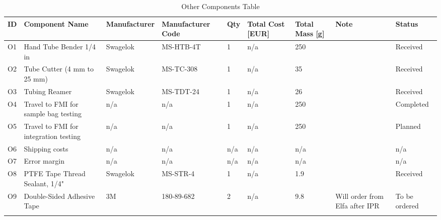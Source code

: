 \begin{longtable} {|m{}|m{}|m{}|m{}|m{}|m{}|m{}|m{}|m{}|} \hline \textbf{ID} & \textbf{Component Name} & \textbf{Manufacturer} & \textbf{Manufacturer Code} & \textbf{Qty} & \textbf{Total Cost [EUR]} & \textbf{Total Mass [g]}  & \textbf{Note}  & \textbf{Status} \\ \hline O1 & Hand Tube Bender 1/4 in & Swagelok & MS-HTB-4T & 1 & n/a & 250 &  & Received \\ \hline O2 & Tube Cutter (4 mm to 25 mm) & Swagelok & MS-TC-308 & 1 & n/a & 35 &  & Received \\ \hline O3 & Tubing Reamer & Swagelok & MS-TDT-24 & 1 & n/a & 26 &  & Received \\ \hline O4 & Travel to FMI for sample bag testing & n/a & n/a & 1 & n/a & 250 &  & Completed \\ \hline O5 & Travel to FMI for integration testing & n/a & n/a & 1 & n/a & 250 &  & Planned \\ \hline O6 & Shipping costs & n/a & n/a & n/a & n/a & n/a &  & n/a \\ \hline O7 & Error margin & n/a & n/a & n/a & n/a & n/a &  & n/a \\ \hline O8 & PTFE Tape Thread Sealant, 1/4" & Swagelok & MS-STR-4 & 1 & n/a & 1.9 &  & Received \\ \hline O9 & Double-Sided Adhesive Tape & 3M & 180-89-682 & 2 & n/a & 9.8 & Will order from Elfa after IPR & To be ordered \\ \hline \caption{Other Components Table} \label{tab:component-table-other} \end{longtable} \raggedbottom